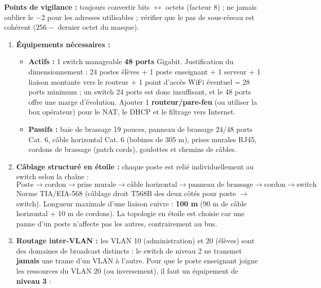 \documentclass[11pt]{article}
\begin{document}
\begin{corrige}
\begin{enumerate}
\begin{itemize}
    \end{itemize}
\end{enumerate}
\textbf{Points de vigilance :} toujours convertir bits $\leftrightarrow$ octets (facteur 8) ; ne jamais oublier le $-2$ pour les adresses utilisables ; vérifier que le pas de sous-réseau est cohérent ($256 - $ dernier octet du masque).
\end{corrige}

\begin{corrige}
\begin{enumerate}
    \item \textbf{Équipements nécessaires :}
    \begin{itemize}
        \item \textbf{Actifs :} 1 switch manageable \textbf{48 ports} Gigabit. Justification du dimensionnement : 24 postes élèves + 1 poste enseignant + 1 serveur + 1 liaison montante vers le routeur + 1 point d'accès WiFi éventuel = 28 ports minimum ; un switch 24 ports est donc insuffisant, et le 48 ports offre une marge d'évolution. Ajouter 1 \textbf{routeur/pare-feu} (ou utiliser la box opérateur) pour le NAT, le DHCP et le filtrage vers Internet.
        \item \textbf{Passifs :} baie de brassage 19 pouces, panneau de brassage 24/48 ports Cat. 6, câble horizontal Cat. 6 (bobines de 305 m), prises murales RJ45, cordons de brassage (patch cords), goulottes et chemins de câbles.
    \end{itemize}
    \item \textbf{Câblage structuré en étoile :} chaque poste est relié individuellement au switch selon la chaîne :
    \[ \text{Poste} \to \text{cordon} \to \text{prise murale} \to \text{câble horizontal} \to \text{panneau de brassage} \to \text{cordon} \to \text{switch} \]
    Norme TIA/EIA-568 (câblage droit T568B des deux côtés pour poste $\to$ switch). Longueur maximale d'une liaison cuivre : \textbf{100 m} (90 m de câble horizontal + 10 m de cordons). La topologie en étoile est choisie car une panne d'un poste n'affecte pas les autres, contrairement au bus.
    \item \textbf{Routage inter-VLAN :} les VLAN 10 (administration) et 20 (élèves) sont des domaines de broadcast distincts : le switch de niveau 2 ne transmet \textbf{jamais} une trame d'un VLAN à l'autre. Pour que le poste enseignant joigne les ressources du VLAN 20 (ou inversement), il faut un équipement de \textbf{niveau 3} :
    \begin{itemize}

\end{itemize}
\end{enumerate}
\end{corrige}
\end{document}
